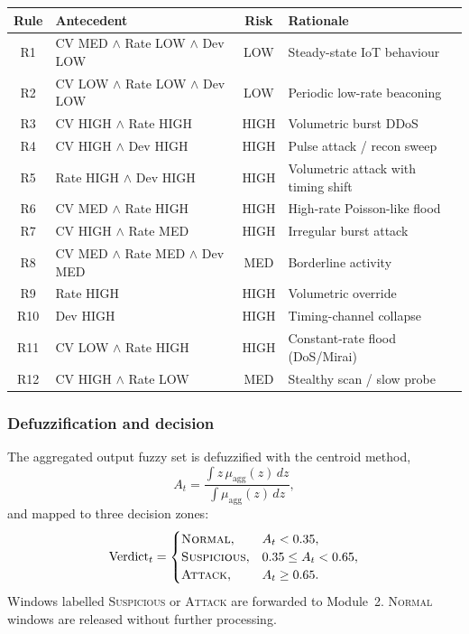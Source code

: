 \documentclass[]{interact}
\theoremstyle{plain}
\theoremstyle{definition}
\begin{document}
\begin{table}[t]
{\begin{tabular}{clcl}
\toprule
Rule & Antecedent & Risk & Rationale \\
\midrule
R1  & CV MED $\wedge$ Rate LOW $\wedge$ Dev LOW  & LOW  & Steady-state IoT behaviour \\
R2  & CV LOW $\wedge$ Rate LOW $\wedge$ Dev LOW  & LOW  & Periodic low-rate beaconing \\
R3  & CV HIGH $\wedge$ Rate HIGH                 & HIGH & Volumetric burst DDoS \\
R4  & CV HIGH $\wedge$ Dev HIGH                  & HIGH & Pulse attack / recon sweep \\
R5  & Rate HIGH $\wedge$ Dev HIGH                & HIGH & Volumetric attack with timing shift \\
R6  & CV MED $\wedge$ Rate HIGH                  & HIGH & High-rate Poisson-like flood \\
R7  & CV HIGH $\wedge$ Rate MED                  & HIGH & Irregular burst attack \\
R8  & CV MED $\wedge$ Rate MED $\wedge$ Dev MED  & MED  & Borderline activity \\
R9  & Rate HIGH                                  & HIGH & Volumetric override \\
R10 & Dev HIGH                                   & HIGH & Timing-channel collapse \\
R11 & CV LOW $\wedge$ Rate HIGH                  & HIGH & Constant-rate flood (DoS/Mirai) \\
R12 & CV HIGH $\wedge$ Rate LOW                  & MED  & Stealthy scan / slow probe \\
\bottomrule
\end{tabular}}
\label{tab:rules}
\end{table}

\subsubsection{Defuzzification and decision}
The aggregated output fuzzy set is defuzzified with the centroid method,
\begin{equation}
  A_t = \frac{\int z\,\mu_{\mathrm{agg}}(z)\,dz}{\int \mu_{\mathrm{agg}}(z)\,dz},
\end{equation}
and mapped to three decision zones:
\begin{equation}
  \text{Verdict}_t = \begin{cases}
  \textsc{Normal}, & A_t < 0.35,\\
  \textsc{Suspicious}, & 0.35 \le A_t < 0.65,\\
  \textsc{Attack}, & A_t \ge 0.65.
  \end{cases}
\end{equation}
Windows labelled \textsc{Suspicious} or \textsc{Attack} are forwarded to Module~2. \textsc{Normal} windows are released without further processing.
\end{document}
